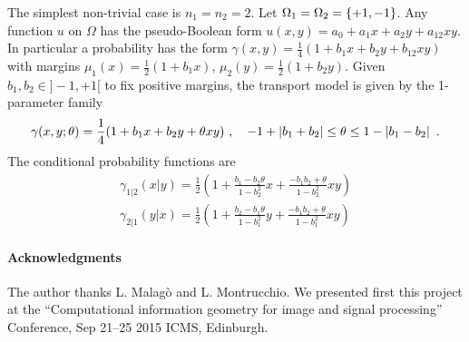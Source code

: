 \documentclass[runningheads]{llncs}
\begin{document}
The simplest non-trivial case is $n_1=n_2=2$. Let
$\Omega_1=\Omega_2=\left\{ +1,-1 \right\}$. Any function $u$ on $\Omega$ has the
pseudo-Boolean form $u(x,y)=a_0+a_1 x + a_2 y + a_{12} xy$. In
particular a probability has the form
$\gamma(x,y) = \frac14(1+b_1x+b_2y+b_{12}xy)$ with margins
$\mu_1(x) = \frac12(1+b_1x)$,
$\mu_2(y) = \frac12(1+b_2y)$. Given
$b_1, b_2 \in ]-1,+1[$ to fix positive margins, the transport model is given
by the 1-parameter family
%
  \begin{equation*}
    \gamma(x,y;\theta) = \frac14(1+ b_1x+ b_2y+\theta xy)\ , \quad -1 + \left| b_1+b_2 \right| \leq \theta \leq 1 - \left| b_1 - b_2 \right| \ .
  \end{equation*}
  The conditional probability functions are 
  \begin{gather*}
  \gamma_{1|2}(x|y) = \frac12 \left(1+\frac{b_1-b_2\theta}{1-b_2^2}x+\frac{-b_1b_2 + \theta}{1-b_2^2}xy\right) \\
  \gamma_{2|1}(y|x) = \frac12 \left(1+\frac{b_2-b_1\theta}{1-b_1^2}y+\frac{-b_1b_2 + \theta}{1-b_1^2}xy\right)
  \end{gather*}


\paragraph{Acknowledgments}
The author thanks L. Malag\`o and L. Montrucchio. We presented first this project at the ``Computational information geometry for image and signal processing'' Conference, Sep 21--25 2015 ICMS, Edinburgh.

%


%
\end{document}
